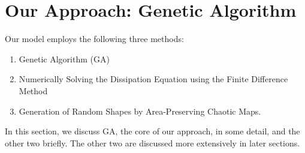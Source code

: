 \documentclass[12pt,draft]{reedmcm}
\begin{document}
\section{Our Approach: Genetic Algorithm}
Our model employs the following three methods:
\begin{enumerate}
  \item Genetic Algorithm (GA)
  \item Numerically Solving the Dissipation Equation using the Finite Difference Method
  \item Generation of Random Shapes by Area-Preserving Chaotic Maps.
\end{enumerate}
In this section, we discuss GA, the core of our approach, in some detail, and the other two briefly.
The other two are discussed more extensively in later sections. 
\end{document}
